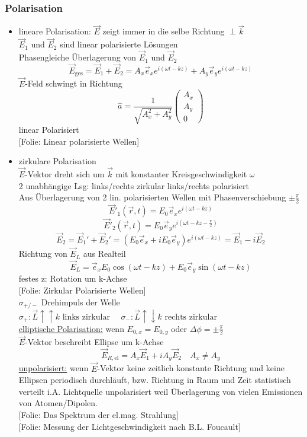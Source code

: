 \documentclass[titlepage,12pt,a4paper,ngerman]{report}
\newcommand{\tx}[1]{\textrm{#1}}
\newcommand{\folie}[1]{\color{gray}[Folie: #1]\color{black}}
\begin{document}
\subsubsection{Polarisation}
\begin{itemize}
	\item lineare Polarisation: $ \vec{E} $ zeigt immer in die selbe Richtung $ \perp \vec{k} $\\
	$ \vec{E}_1 $ und $ \vec{E}_2 $ sind linear polarisierte Lösungen\\[5pt]
	Phasengleiche Überlagerung von $ \vec{E}_1 $ und $ \vec{E}_2 $\\
	$$ \vec{E}_{\tx{ges}} = \vec{E}_1 + \vec{E}_2 = A_x \vec{e}_x e ^{i(\omega t - k z)} + A_y \vec{e}_y e ^{i(\omega t - k z)} $$
	$ \vec{E} $-Feld schwingt in Richtung 
	$$\hat{a} = \frac{1}{\sqrt{A_x^2 + A_y^2}} \begin{pmatrix}
	A_x \\A_y \\0
	\end{pmatrix}$$
	linear Polarisiert\\
	\folie{Linear polarisierte Wellen}
	\item zirkulare Polarisation\\
	$ \vec{E} $-Vektor dreht sich um $ \vec{k} $ mit konstanter Kreisgeschwindigkeit $ \omega $\\
	2 unabhängige Lsg: links/rechts zirkular links/rechts polarisiert\\
	Aus Überlagerung von 2 lin. polarisierten Wellen mit Phasenverschiebung $ \pm \frac{\pi}{2} $
	$$\vec{E}'_1(\vec{r},t) = E_0 \vec{e}_x e^{i(\omega t - k z)}$$
	$$\vec{E}'_2(\vec{r},t) = E_0 \vec{e}_y e^{i(\omega t - k z - \frac{\pi}{2})}$$
	$$\vec{E}_2 = \vec{E}_1' + \vec{E}_2' = (E_0 \vec{e}_x + i E_0 \vec{e}_y) e^{i(\omega t -kz)} = \vec{E}_1 - i \vec{E}_2$$
	Richtung von $ \vec{E}_L $ aus Realteil
	$$\vec{E}_L = \vec{e}_x E_0 \cos(\omega t - kz) + E_0 \vec{e}_y \sin(\omega t - kz)$$
	festes z: Rotation um k-Achse\\
	\folie{Zirkular Polarisierte Wellen}\\
	$ \sigma_{+/-} $ Drehimpuls der Welle $ \sigma_+ : \vec{L}\uparrow \uparrow k \tx{ links zirkular }\quad \sigma_-: \vec{L} \uparrow \downarrow k \tx{ rechts zirkular }$\\
	\underline{elliptische Polarisation:} wenn $ E_{0,x} = E_{0,y} $ oder $ \Delta \phi = \pm \frac{\pi}{2} $\\
	$ \vec{E} $-Vektor beschreibt Ellipse um k-Achse\\
	$$ \vec{E}_{R,\tx{el}} = A_x \vec{E}_1 + i A_y \vec{E}_2 \quad A_x \neq A_y $$
	\underline{unpolarisiert:} wenn $ \vec{E} $-Vektor keine zeitlich konstante Richtung und keine Ellipsen periodisch durchläuft, bzw. Richtung in Raum und Zeit statistisch verteilt i.A. Lichtquelle unpolarisiert weil Überlagerung von vielen Emissionen von Atomen/Dipolen.\\
	\folie{Das Spektrum der el.mag. Strahlung}\\
	\folie{Messung der Lichtgeschwindigkeit nach B.L. Foucault}
\end{itemize}
\end{document}
